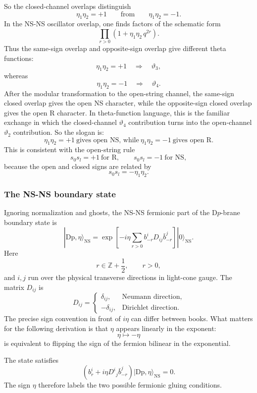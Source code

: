 \documentclass[
  10pt,
  a4paper,
  openany]{book}
\begin{document}
So the closed-channel overlaps distinguish \[
\eta_1\eta_2=+1
\qquad
\text{from}
\qquad
\eta_1\eta_2=-1.
\] In the NS-NS oscillator overlap, one finds factors of the schematic
form \[
\prod_{r>0}\left(1+\eta_1\eta_2\,q^{2r}\right).
\] Thus the same-sign overlap and opposite-sign overlap give different
theta functions: \[
\eta_1\eta_2=+1
\quad\Longrightarrow\quad
\vartheta_3,
\] whereas \[
\eta_1\eta_2=-1
\quad\Longrightarrow\quad
\vartheta_4.
\] After the modular transformation to the open-string channel, the
same-sign closed overlap gives the open NS character, while the
opposite-sign closed overlap gives the open R character. In
theta-function language, this is the familiar exchange in which the
closed-channel \(\vartheta_4\) contribution turns into the open-channel
\(\vartheta_2\) contribution. So the slogan is: \[
\boxed{
\eta_1\eta_2=+1\ \text{gives open NS, while}\ 
\eta_1\eta_2=-1\ \text{gives open R.}
}
\] This is consistent with the open-string rule \[
s_0s_l=+1\ \text{for R},
\qquad
s_0s_l=-1\ \text{for NS},
\] because the open and closed signs are related by \[
s_0s_l=-\eta_1\eta_2.
\]

\subsubsection{The NS-NS boundary state}\label{the-ns-ns-boundary-state}

Ignoring normalization and ghosts, the NS-NS fermionic part of the
D\(p\)-brane boundary state is \[
|\mathrm{Dp},\eta\rangle_{\mathrm{NS}}
=
\exp\left[
-i\eta
\sum_{r>0}
b^i_{-r}D_{ij}\bar b^j_{-r}
\right]
|0\rangle_{\mathrm{NS}}.
\] Here \[
r\in\mathbb Z+\frac{1}{2},
\qquad
r>0,
\] and \(i,j\) run over the physical transverse directions in light-cone
gauge. The matrix \(D_{ij}\) is \[
D_{ij}
=
\begin{cases}
\delta_{ij}, & \text{Neumann direction},\\
-\delta_{ij}, & \text{Dirichlet direction}.
\end{cases}
\] The precise sign convention in front of \(i\eta\) can differ between
books. What matters for the following derivation is that \(\eta\)
appears linearly in the exponent: \[
\eta\mapsto -\eta
\] is equivalent to flipping the sign of the fermion bilinear in the
exponential.

The state satisfies \[
\left(b_r^i+i\eta D^i{}_j\bar b^j_{-r}\right)
|\mathrm{Dp},\eta\rangle_{\mathrm{NS}}=0.
\] The sign \(\eta\) therefore labels the two possible fermionic gluing
conditions.
\end{document}
